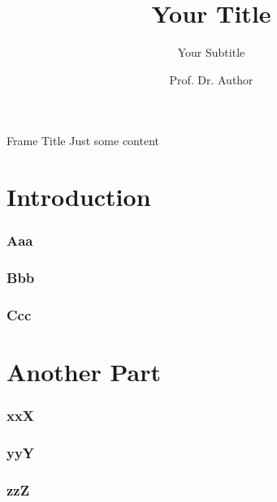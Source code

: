 \documentclass[aspectratio=169]{beamer}
\author{Prof. Dr. Author}
\title{Your Title}
\subtitle{Your Subtitle}
\begin{document}
\maketitle

\begin{frame}{Frame Title}
Just some content
\end{frame}

\part{Introduction}
\frame{\partpage}

\section{Aaa}
\frame{\sectionpage}

\section{Bbb}
\frame{\sectionpage}

\section{Ccc}
\frame{\sectionpage}

\part{Another Part}
\frame{\partpage}

\section{xxX}
\frame{\sectionpage}

\section{yyY}
\frame{\sectionpage}

\section{zzZ}
\frame{\sectionpage}
\end{document}
